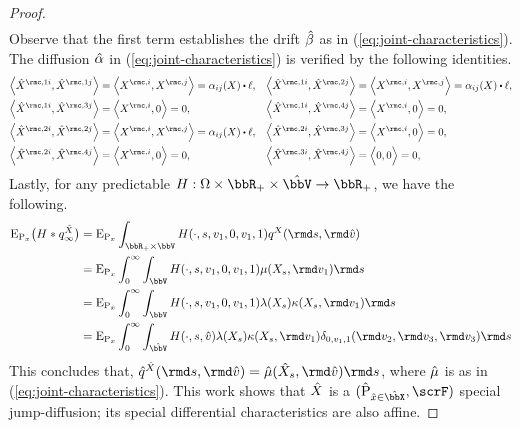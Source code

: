 \begin{proof}
\begin{align*}
  \end{align*}
  Observe that the first term establishes the drift $\hat{\beta}$ as in (\ref{eq:joint-characteristics}).
  The diffusion $\hat{\alpha}$ in (\ref{eq:joint-characteristics}) is verified by the following identities.
  \begin{align*}
    \Bprj{\hat\X^{\rmc,1i}}{\hat\X^{\rmc,1j}} &= \Bprj{\X^{\rmc,i}}{\X^{\rmc,j}} = \affDiff_{ij}(\X) \shortInt \leb, &
    \Bprj{\hat\X^{\rmc,1i}}{\hat\X^{\rmc,2j}} &= \Bprj{\X^{\rmc,i}}{\X^{\rmc,j}} = \affDiff_{ij}(\X) \shortInt \leb, \\
    \Bprj{\hat\X^{\rmc,1i}}{\hat\X^{\rmc,3j}} &= \Bprj{\X^{\rmc,i}}{0} = 0, &
    \Bprj{\hat\X^{\rmc,1i}}{\hat\X^{\rmc,4j}} &= \Bprj{\X^{\rmc,i}}{0} = 0, \\
    \Bprj{\hat\X^{\rmc,2i}}{\hat\X^{\rmc,2j}} &= \Bprj{\X^{\rmc,i}}{\X^{\rmc,j}} = \affDiff_{ij}(\X) \shortInt \leb, &
    \Bprj{\hat\X^{\rmc,2i}}{\hat\X^{\rmc,3j}} &= \Bprj{\X^{\rmc,i}}{0} = 0,  \\
    \Bprj{\hat\X^{\rmc,2i}}{\hat\X^{\rmc,4j}} &= \Bprj{\X^{\rmc,i}}{0} = 0, &
    \Bprj{\hat\X^{\rmc,3i}}{\hat\X^{\rmc,4j}} &= \Bprj{0}{0} = 0, 
  \end{align*}
  Lastly, for any predictable $H: \Omega \times \bbR_+ \times \hat\vecSpace \rightarrow \bbR_+$, we have the following.
  \begin{align*}
    \Exp_{\Prb_\stateVar} \big( H \ast \jumpMeas^{\hat\X}_\infty \big)
    &= \Exp_{\Prb_\stateVar} \int_{\bbR_+\times\vecSpace} H(\cdot, s, \markVar_1, 0, \markVar_1, 1) \jumpMeas^\X(\rmd s, \rmd\hat\markVar) \\
    &= \Exp_{\Prb_\stateVar} \int_0^\infty \int_\vecSpace H(\cdot, s, \markVar_1, 0, \markVar_1, 1) \affJump(\X_s, \rmd\markVar_1) \rmd s \\
    &= \Exp_{\Prb_\stateVar} \int_0^\infty \int_\vecSpace H(\cdot, s, \markVar_1, 0, \markVar_1, 1) \affInt(\X_s) \affDist(\X_s, \rmd\markVar_1)  \rmd s \\
    &= \Exp_{\Prb_\stateVar} \int_0^\infty \int_{\hat\vecSpace} H(\cdot, s, \hat\markVar) \affInt(\X_s) \affDist(\X_s, \rmd\markVar_1) \delta_{0,\markVar_1,1}(\rmd\markVar_2,\rmd\markVar_3,\rmd\markVar_3)  \rmd s
  \end{align*}
  This concludes that, $\predproj{\jumpMeas^{\hat\X}}(\rmd s, \rmd\hat\markVar) = \hat\affJump(\hat\X_s, \rmd\hat\markVar) \rmd s$, where $\hat{\mu}$ is as in (\ref{eq:joint-characteristics}).
  This work shows that $\hat{X}$ is a $(\hat\Prb_{\hat\stateVar\in\hat\stateSpace}, \scrF)$ special jump-diffusion; its special differential characteristics are also affine.

\end{proof}
